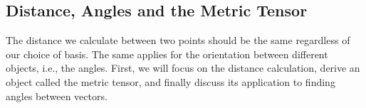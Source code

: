 %


\subsection{Distance, Angles and the Metric Tensor}

The distance we calculate between two points should be the same regardless of our choice of basis. The same applies for the orientation between different objects, i.e., the angles. First, we will focus on the distance calculation, derive an object called the metric tensor, and finally discuss its application to finding angles between vectors.

